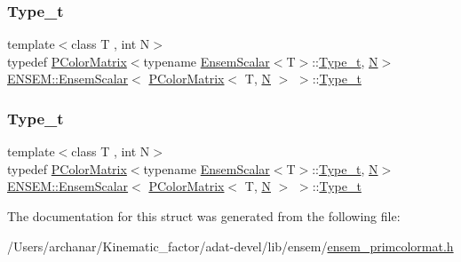 \subsubsection{\texorpdfstring{Type\_t}{Type\_t}\hspace{0.1cm}{\footnotesize\ttfamily [2/3]}}
{\footnotesize\ttfamily template$<$class T , int N$>$ \\
typedef \mbox{\hyperlink{classENSEM_1_1PColorMatrix}{P\+Color\+Matrix}}$<$typename \mbox{\hyperlink{structENSEM_1_1EnsemScalar}{Ensem\+Scalar}}$<$T$>$\+::\mbox{\hyperlink{structENSEM_1_1EnsemScalar_3_01PColorMatrix_3_01T_00_01N_01_4_01_4_a627b90bc6a46b2ef5b68cc55ae3f914d}{Type\+\_\+t}}, \mbox{\hyperlink{adat__devel_2lib_2hadron_2operator__name__util_8cc_a7722c8ecbb62d99aee7ce68b1752f337}{N}}$>$ \mbox{\hyperlink{structENSEM_1_1EnsemScalar}{E\+N\+S\+E\+M\+::\+Ensem\+Scalar}}$<$ \mbox{\hyperlink{classENSEM_1_1PColorMatrix}{P\+Color\+Matrix}}$<$ T, \mbox{\hyperlink{adat__devel_2lib_2hadron_2operator__name__util_8cc_a7722c8ecbb62d99aee7ce68b1752f337}{N}} $>$ $>$\+::\mbox{\hyperlink{structENSEM_1_1EnsemScalar_3_01PColorMatrix_3_01T_00_01N_01_4_01_4_a627b90bc6a46b2ef5b68cc55ae3f914d}{Type\+\_\+t}}}

\mbox{\label{structENSEM_1_1EnsemScalar_3_01PColorMatrix_3_01T_00_01N_01_4_01_4_a627b90bc6a46b2ef5b68cc55ae3f914d}} 
\subsubsection{\texorpdfstring{Type\_t}{Type\_t}\hspace{0.1cm}{\footnotesize\ttfamily [3/3]}}
{\footnotesize\ttfamily template$<$class T , int N$>$ \\
typedef \mbox{\hyperlink{classENSEM_1_1PColorMatrix}{P\+Color\+Matrix}}$<$typename \mbox{\hyperlink{structENSEM_1_1EnsemScalar}{Ensem\+Scalar}}$<$T$>$\+::\mbox{\hyperlink{structENSEM_1_1EnsemScalar_3_01PColorMatrix_3_01T_00_01N_01_4_01_4_a627b90bc6a46b2ef5b68cc55ae3f914d}{Type\+\_\+t}}, \mbox{\hyperlink{adat__devel_2lib_2hadron_2operator__name__util_8cc_a7722c8ecbb62d99aee7ce68b1752f337}{N}}$>$ \mbox{\hyperlink{structENSEM_1_1EnsemScalar}{E\+N\+S\+E\+M\+::\+Ensem\+Scalar}}$<$ \mbox{\hyperlink{classENSEM_1_1PColorMatrix}{P\+Color\+Matrix}}$<$ T, \mbox{\hyperlink{adat__devel_2lib_2hadron_2operator__name__util_8cc_a7722c8ecbb62d99aee7ce68b1752f337}{N}} $>$ $>$\+::\mbox{\hyperlink{structENSEM_1_1EnsemScalar_3_01PColorMatrix_3_01T_00_01N_01_4_01_4_a627b90bc6a46b2ef5b68cc55ae3f914d}{Type\+\_\+t}}}



The documentation for this struct was generated from the following file\+:\begin{DoxyCompactItemize}
\item 
/\+Users/archanar/\+Kinematic\+\_\+factor/adat-\/devel/lib/ensem/\mbox{\hyperlink{adat-devel_2lib_2ensem_2ensem__primcolormat_8h}{ensem\+\_\+primcolormat.\+h}}\end{DoxyCompactItemize}
